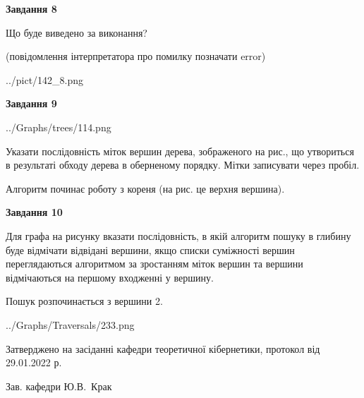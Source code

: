 \documentclass[12pt, ukrainian]{article}
\begin{document}
{\begin {large}
{\begin {center}\textbf{Завдання 8}\end {center}}\par
Що буде виведено за виконання?\par
 (повідомлення інтерпретатора про помилку позначати error)\par
\begin{center}
	{../pict/142_8.png}
\end{center}
\newpage

{\begin {center}\textbf{Завдання 9}\end {center}}\par

\begin{center}
	{../Graphs/trees/114.png}
\end{center}
Указати послідовність міток вершин дерева, зображеного на рис., що утвориться в результаті обходу дерева в оберненому порядку. Мітки записувати через пробіл.\par Алгоритм починає роботу з кореня (на рис. це верхня вершина).\par
\newpage

{\begin {center}\textbf{Завдання 10}\end {center}}\par
Для графа на рисунку вказати послідовність, в якій алгоритм пошуку в глибину буде відмічати відвідані вершини, якщо списки суміжності вершин переглядаються алгоритмом за зростанням міток вершин та вершини відмічаються на першому вход\-женні у вершину.\par
Пошук розпочинається з вершини 2.\par

\begin{center}
	{../Graphs/Traversals/233.png}
\end{center}\par
\newpage


\end {large}
}
{\smallskip \begin {small} Затверджено на засіданні кафедри теоретичної кібернетики, протокол  від   29.01.2022 р.\par\smallskip\smallskip
{\parbox {6.5 cm}{Зав. кафедри \dotfill Ю.В.~Крак}} \end{small}}
\end{document}
